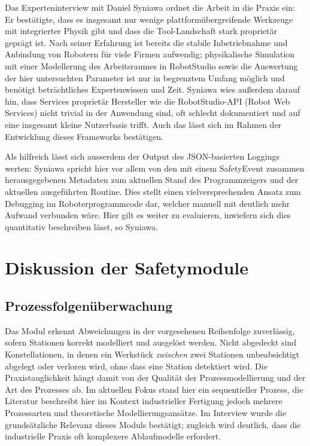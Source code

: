 \noindent Das Experteninterview mit Daniel Syniawa ordnet die Arbeit in die
Praxis ein: Er bestätigte, dass es insgesamt nur wenige plattformübergreifende
Werkzeuge mit integrierter Physik gibt und dass die Tool-Landschaft stark
proprietär geprägt ist. Nach seiner Erfahrung ist bereits die stabile
Inbetriebnahme und Anbindung von Robotern für viele Firmen aufwendig;
physikalische Simulation mit einer Modellerung des Arbeitsraumes in RobotStudio
sowie die Auswertung der hier untersuchten Parameter ist nur in begrenztem
Umfang möglich und benötigt beträchtliches Expertenwissen und Zeit. Syniawa wies
außerdem darauf hin, dass Services proprietär Hersteller wie die RobotStudio-API
(Robot Web Services) nicht trivial in der Anwendung sind, oft schlecht
dokumentiert und auf eine insgesamt kleine Nutzerbasis trifft. Auch das lässt
sich im Rahmen der Entwicklung dieses Frameworks bestätigen.

Als hilfreich lässt sich ausserdem der Output des JSON-basierten Loggings
werten: Syniawa spricht hier vor allem von den mit einem SafetyEvent zusammen
herausgegebenen Metadaten zum aktuellen Stand des Programmzeigers und
der aktuellen
ausgeführten Routine. Dies stellt einen vielversprechenden Ansatz zum Debugging
im Roboterprogrammcode dar, welcher manuell mit deutlich mehr Aufwand verbunden
wäre. Hier gilt es weiter zu evaluieren, inwiefern sich dies quantitativ
beschreiben lässt, so Syniawa.

\section{Diskussion der Safetymodule}

\subsection{Prozessfolgenüberwachung}

Das Modul erkennt Abweichungen in der vorgesehenen Reihenfolge zuverlässig,
sofern Stationen korrekt modelliert und ausgelöst werden. Nicht abgedeckt sind
Konstellationen, in denen ein Werkstück \emph{zwischen} zwei Stationen
unbeabsichtigt abgelegt oder verloren wird, ohne dass eine Station detektiert
wird. Die Praxistauglichkeit hängt damit von der Qualität der
Prozessmodellierung und der Art des Prozesses ab. Im aktuellen Fokus stand hier
ein sequentieller Prozess, die Literatur beschreibt hier im Kontext
industrieller Fertigung jedoch mehrere Prozessarten und theoretische
Modellierungsansätze. Im Interview wurde die grundsätzliche Relevanz dieses
Moduls bestätigt; zugleich wird deutlich, dass die industrielle Praxis oft
komplexere Ablaufmodelle erfordert.


